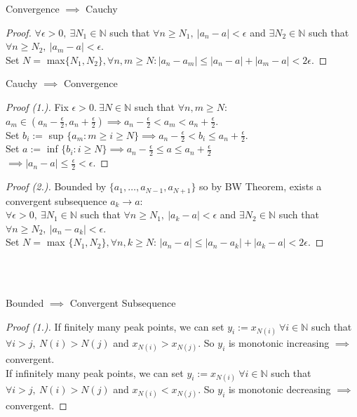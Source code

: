 \begin{theorem}	
Convergence $\implies$ Cauchy
\end{theorem}
\begin{proof}
$\forall \epsilon > 0,~ \exists N_1 \in \mathbb{N}$ such that $\forall n\geq N_1,~ |a_n	 - a| < \epsilon$ and $\exists N_2 \in \mathbb{N}$ such that $\forall n \geq N_2,~ |a_m - a| < \epsilon$.\\ Set $N =$ max$\{N_1,N_2\}, \forall n,m \geq N: |a_n - a_m| \leq |a_n - a| + |a_m - a| < 2\epsilon$.
\end{proof}\vspace*{5pt}

\begin{theorem}
Cauchy $\implies$ Convergence	
\end{theorem}
\begin{proof}[Proof (1.)]
	Fix $\epsilon >0.~ \exists N \in \mathbb{N}$ such that $\forall n,m \geq N:$\\$ a_m \in (a_n - \frac{\epsilon}{2},a_n + \frac{\epsilon}{2}) \implies a_n - \frac{\epsilon}{2} < a_m < a_n + \frac{\epsilon}{2}$.\\ 
	 Set $b_i :=$ sup $\{a_m : m \geq i \geq N\} \implies  a_n - \frac{\epsilon}{2} < b_i \leq  a_n + \frac{\epsilon}{2}$.\\ Set $a:=$ inf $\{b_i : i \geq N\} \implies  a_n - \frac{\epsilon}{2} \leq a \leq a_n + \frac{\epsilon}{2} $\\ $\implies |a_n - a| \leq \frac{\epsilon}{2} < \epsilon.$
\end{proof}
\begin{proof}[Proof (2.)]
	Bounded by $\{a_1,\dots,a_{N-1},a_{N+1}\}$ so by BW Theorem, exists a convergent subsequence $a_k \to a$:\\ $\forall \epsilon >0, ~\exists N_1 \in \mathbb{N}$ such that $\forall n \geq N_1,~|a_k - a| < \epsilon$ and $\exists N_2 \in \mathbb{N}$ such that $\forall n \geq N_2,~ |a_n - a_k| < \epsilon$.\\ Set $N =$ max $\{N_1,N_2\},\forall n,k \geq N$: $|a_n - a| \leq |a_n - a_k| + |a_k - a| < 2\epsilon$. 
\end{proof}~\\

~

\begin{theorem}
Bounded $\implies$ Convergent Subsequence 
\end{theorem}
\begin{proof}[Proof (1.)]
If finitely many peak points, we can set $y_i:= x_{N(i)}~\forall i \in \mathbb{N}$ such that $\forall i > j,~ N(i)> N(j)$ and $x_{N(i)} > x_{N(j)}$. So $y_i$ is monotonic increasing $\implies$ convergent.\\

If infinitely many peak points, we can set $y_i:= x_{N(i)}~\forall i \in \mathbb{N}$ such that $\forall i > j,~ N(i)> N(j)$ and $x_{N(i)} < x_{N(j)}$. So $y_i$ is monotonic decreasing $\implies$ convergent.
\end{proof}\vspace*{5pt}

